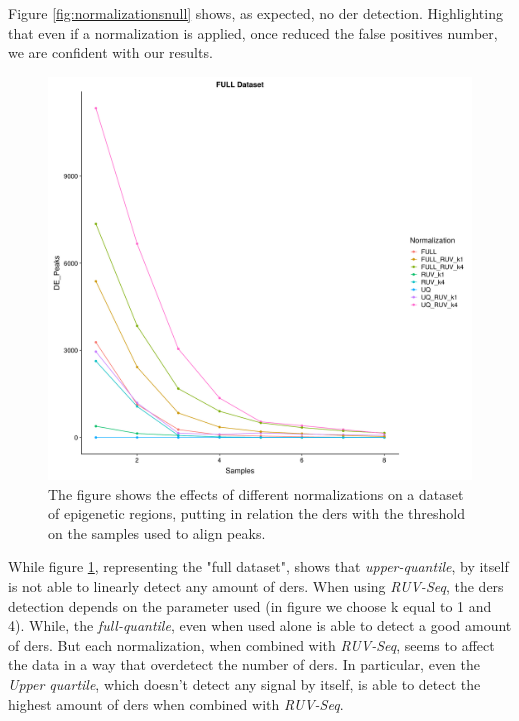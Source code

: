 Figure \ref{fig:normalizationsnull} shows, as expected, no \gls{der} detection. 
Highlighting that even if a normalization is applied, once reduced the false positives number, we are confident with our results.


\begin{figure}[H]
\centering
\includegraphics[width=\textwidth, keepaspectratio]{img/descan2/full_final.pdf}
\caption[Normalizations applied to detected regions]{The figure shows the effects of different normalizations on a dataset of epigenetic regions, putting in relation the \glspl{der} with the threshold on the samples used to align peaks.}
\label{fig:normalizationsfull}
\centering
\end{figure}

While figure \ref{fig:normalizationsfull}, representing the "full dataset", shows that \textit{upper-quantile}, by itself is not able to linearly detect any amount of \glspl{der}.
When using \textit{RUV-Seq}, the \glspl{der} detection depends on the parameter used (in figure we choose k equal to 1 and 4).
While, the \textit{full-quantile}, even when used alone is able to detect a good amount of \glspl{der}.
But each normalization, when combined with \textit{RUV-Seq}, seems to affect the data in a way that overdetect the number of \glspl{der}. 
In particular, even the \textit{Upper quartile}, which doesn't detect any signal by itself, is able to detect the highest amount of \glspl{der} when combined with \textit{RUV-Seq}.

